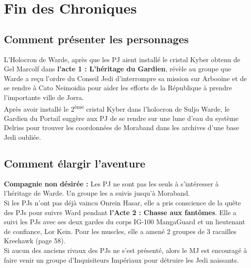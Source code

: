\documentclass[twoside]{article}
\begin{document}
\section{Fin des Chroniques}
\subsection{Comment présenter les personnages}

L'Holocron de Warde, après que les PJ aient installé le cristal Kyber obtenu de Gel Marcolf dans \textbf{l'acte 1 : L'héritage du Gardien}, révèle au groupe que Warde a reçu l'ordre du Conseil Jedi d'interrompre sa mission sur Arbooine et de se rendre à Cato Neimoidia pour aider les efforts de la République à prendre l'importante ville de Jorra.\\

Après avoir installé le 2\textsuperscript{ème} cristal Kyber dans l'holocron de Suljo Warde, le Gardien du Portail suggère aux PJ de se rendre sur une lune d'eau du système Delriss pour trouver les coordonnées de Moraband dans les archives d'une base Jedi oubliée.\\


\subsection{Comment élargir l'aventure}

\textbf{Compagnie non désirée :} Les PJ ne sont pas les seuls à s'intéresser à l'héritage de Warde. Un groupe les a suivis jusqu'à Moraband.\\

Si les PJs n'ont pas déjà vaincu Onrein Hasar, elle a pris conscience de la quête des PJs pour suivre Ward pendant \textbf{l'Acte 2 : Chasse aux fantômes}. Elle a suivi les PJs avec ses deux gardes du corps IG-100 MangaGuard et un lieutenant de confiance, Lor Kein. Pour les muscles, elle a amené 2 groupes de 3 racailles Kreehawk (page 58).\\

Si aucun des anciens rivaux des PJs ne s'est présenté, alors le MJ est encouragé à faire venir un groupe d'Inquisiteurs Impériaux pour détruire les Jedi naissants.\\
\end{document}
